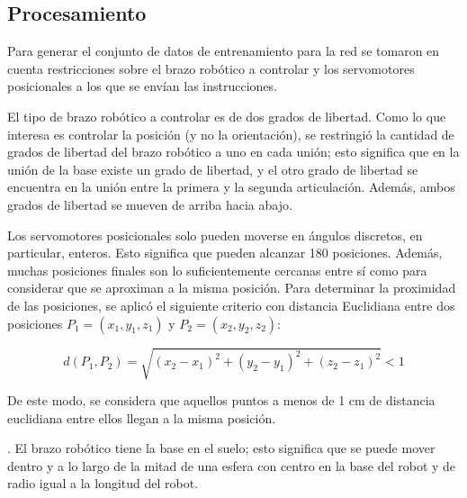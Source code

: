 \subsection{Procesamiento}

Para generar el conjunto de datos de entrenamiento para la red se tomaron en cuenta restricciones sobre el brazo robótico a controlar y los servomotores posicionales a los que se envían las instrucciones.

El tipo de brazo robótico a controlar es de dos grados de libertad. Como lo que interesa es controlar la posición (y no la orientación), se restringió la cantidad de grados de libertad del brazo robótico a uno en cada unión; esto significa que en la unión de la base existe un grado de libertad, y el otro grado de libertad se encuentra en la unión entre la primera y la segunda articulación. Además, ambos grados de libertad se mueven de arriba hacia abajo.

Los servomotores posicionales solo pueden moverse en ángulos discretos, en particular, enteros. Esto significa que pueden alcanzar 180 posiciones. Además, muchas posiciones finales son lo suficientemente cercanas entre sí como para considerar que se aproximan a la misma posición.  Para determinar la proximidad de las posiciones, se aplicó el siguiente criterio con distancia Euclidiana entre dos posiciones $P_1 = (x_1, y_1, z_1)$ y $P_2 = (x_2, y_2, z_2)$:

\begin{equation}
	d(P_1, P_2) = \sqrt{(x_2 - x_1)^2 + (y_2 - y_1)^2 + (z_2 - z_1)^2} < 1
\end{equation}

De este modo, se considera que aquellos puntos a menos de 1 cm de distancia euclidiana entre ellos llegan a la misma posición. 

. El brazo robótico tiene la base en el suelo; esto significa que se puede mover dentro y a lo largo de la mitad de una esfera con centro en la base del robot y de radio igual a la longitud del robot.